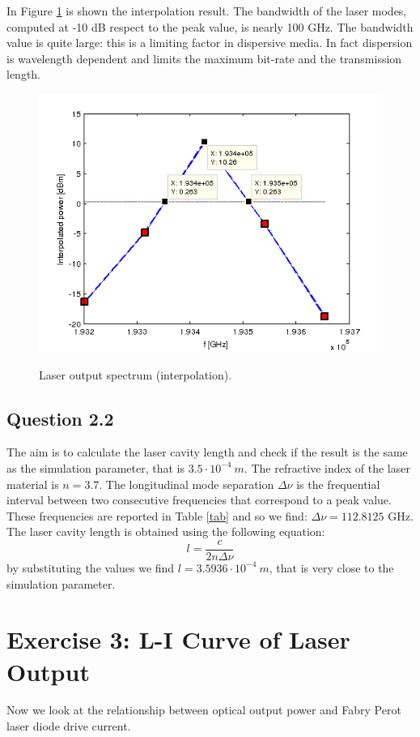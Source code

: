 \documentclass[a4paper,10pt]{report}
\begin{document}
In Figure \ref{Tx1_22} is shown the interpolation result.
The bandwidth of the laser modes, computed at -10 dB respect to the peak value, is nearly 100 GHz.
The bandwidth value is quite large: this is a limiting factor in dispersive media.
In fact dispersion is wavelength dependent and limits the maximum bit-rate and the transmission length.


\begin{figure}[!ht]
  \centering
  \includegraphics[width=12cm]{Tx1_22.png}\\
  \caption{Laser output spectrum (interpolation).}
  \label{Tx1_22}
\end{figure}


\newpage
\subsection*{Question 2.2}
The aim is to calculate the laser cavity length and check if the result is the same as the simulation parameter, that is $3.5 \cdot 10^{-4} \ m$.
The refractive index of the laser material is $n=3.7$.
The longitudinal mode separation $\Delta \nu$ is the frequential interval between two consecutive frequencies that correspond to a peak value.
These frequencies are reported in Table \ref{tab} and so we find: $\Delta \nu = 112.8125$ GHz.
The laser cavity length is obtained using the following equation:
$$ l = \frac{c}{2 n \Delta \nu}$$
by substituting the values we find $l = 3.5936 \cdot 10^{-4} \ m$, that is very close to the simulation parameter.



\section*{Exercise 3: L-I Curve of Laser Output}
Now we look at the relationship between optical output power and Fabry Perot laser diode drive current.
\end{document}
